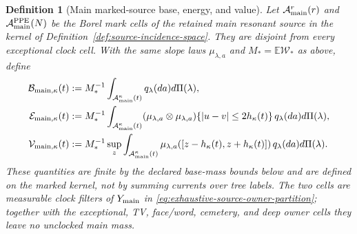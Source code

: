 \documentclass[11pt]{article}
\newtheorem{definition}[theorem]{Definition}
\begin{document}
\begin{definition}[Main marked-source base, energy, and value]
\label{def:main-source-BEV}
Let $\mathcal A_{\rm main}^{r}(r)$ and
$\mathcal A_{\rm main}^{\rm PPE}(N)$ be the Borel mark cells of the retained
main resonant source in the kernel of
Definition~\ref{def:source-incidence-space}.  They are disjoint from every
exceptional clock cell.  With the same slope laws $\mu_{\lambda,a}$ and
$M_*=\mathbb E\mathscr W_*$ as above, define
\begin{align}
 \mathcal B_{{\rm main},\kappa}(t)&:=M_*^{-1}
  \int_{\mathcal A_{\rm main}^{\kappa}(t)}q_\lambda(da)d\Pi(\lambda),
  \notag\\
 \mathcal E_{{\rm main},\kappa}(t)&:=M_*^{-1}
  \int_{\mathcal A_{\rm main}^{\kappa}(t)}
  (\mu_{\lambda,a}\otimes\mu_{\lambda,a})
  \{|u-v|\le2h_\kappa(t)\}\,q_\lambda(da)d\Pi(\lambda),
  \notag\\
 \mathcal V_{{\rm main},\kappa}(t)&:=M_*^{-1}\sup_z
  \int_{\mathcal A_{\rm main}^{\kappa}(t)}
  \mu_{\lambda,a}([z-h_\kappa(t),z+h_\kappa(t)])
  \,q_\lambda(da)d\Pi(\lambda).
 \label{eq:main-source-BEV}
\end{align}
These quantities are finite by the declared base-mass bounds below and are
defined on the marked kernel, not by summing currents over tree labels.
The two cells are measurable clock filters of $Y_{\rm main}$ in
\eqref{eq:exhaustive-source-owner-partition}; together with the exceptional,
TV, face/word, cemetery, and deep owner cells they leave no unclocked main
mass.
\end{definition}
\end{document}
